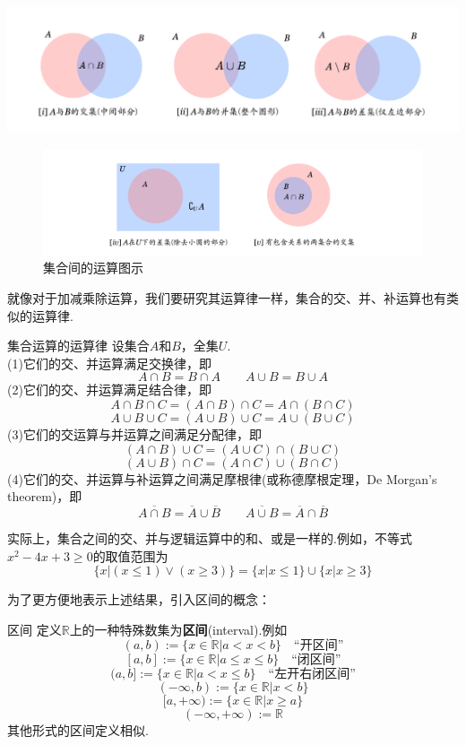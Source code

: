 \documentclass[lang=cn, zihao=5]{elegantbook}
\newcommand{\R}{\mathbb{R}}
\begin{document}
\begin{center}
	\includegraphics{attachment/20230318jihe.pdf}
\end{center}
\begin{figure}[H]
	\centering
	\includegraphics{attachment/20230318jihe2.pdf}
	\caption{集合间的运算图示}
\end{figure}

就像对于加减乘除运算，我们要研究其运算律一样，集合的交、并、补运算也有类似的运算律.

\begin{proposition}{集合运算的运算律}
	设集合$A$和$B$，全集$U$. \\
	(1)它们的交、并运算满足交换律，即$$A \cap B = B \cap A \qquad A \cup B = B \cup A$$
	(2)它们的交、并运算满足结合律，即
	$$A \cap B \cap C = (A \cap B) \cap C = A \cap (B \cap C)$$
	$$A \cup B \cup C = (A \cup B) \cup C = A \cup (B \cup C)$$
	(3)它们的交运算与并运算之间满足分配律，即
	$$(A \cap B) \cup C = (A \cup C) \cap (B \cup C)$$
	$$(A \cup B) \cap C = (A \cap C) \cup (B \cap C)$$
	(4)它们的交、并运算与补运算之间满足摩根律(或称德摩根定理，De Morgan's theorem)，即$$\overline{A \cap B} = \overline{A} \cup \overline{B} \qquad \overline{A \cup B} = \overline{A} \cap \overline{B}$$
\end{proposition}

实际上，集合之间的交、并与逻辑运算中的和、或是一样的.例如，不等式$x^2-4x+3 \geq 0$的取值范围为$$\{ x|(x \leq 1) \vee (x \geq 3) \} = \{ x|x \leq 1 \} \cup \{ x|x \geq 3 \}$$

为了更方便地表示上述结果，引入区间的概念：

\begin{definition}{区间}
	定义$\R$上的一种特殊数集为\textbf{区间}(interval).例如 \\
	$$(a,b):=\{ x \in \R | a<x<b \} \quad \textit{“开区间”}$$
	$$[a,b]:=\{ x \in \R | a \leq x \leq b \} \quad \textit{“闭区间”}$$
	$$(a,b]:=\{ x \in \R | a<x \leq b \} \quad \textit{“左开右闭区间”}$$
	$$(-\infty,b):=\{ x \in \R | x<b \}$$
	$$[a,+\infty):=\{ x \in \R | x \geq a \}$$
	$$(-\infty ,+\infty):= \R $$
	其他形式的区间定义相似.
\end{definition}
\end{document}
